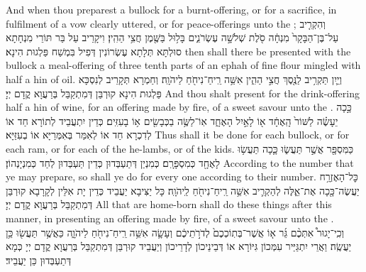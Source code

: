 {And when thou preparest a bullock for a burnt-offering, or for a sacrifice, in fulfilment of a vow clearly uttered, or for peace-offerings unto the \lord;}{}
{וְהִקְרִ֤יב עַל־בֶּן־הַבָּקָר֙ מִנְחָ֔ה סֹ֖לֶת שְׁלֹשָׁ֣ה עֶשְׂרֹנִ֑ים בָּל֥וּל בַּשֶּׁ֖מֶן חֲצִ֥י הַהִֽין׃}
{וִיקָרֵיב עַל בַּר תּוֹרֵי מִנְחָתָא סוּלְתָּא תְּלָתָא עֶשְׂרוֹנִין דְּפִיל בִּמְשַׁח פַּלְגוּת הִינָא׃}
{then shall there be presented with the bullock a meal-offering of three tenth parts of an ephah of fine flour mingled with half a hin of oil.}{}
{וְיַ֛יִן תַּקְרִ֥יב לַנֶּ֖סֶךְ חֲצִ֣י הַהִ֑ין אִשֵּׁ֥ה רֵֽיחַ־נִיחֹ֖חַ לַיהֹוָֽה׃
}
{וְחַמְרָא תְּקָרֵיב לְנִסְכָּא פַּלְגוּת הִינָא קוּרְבַּן דְּמִתְקַבַּל בְּרַעֲוָא קֳדָם יְיָ׃}
{And thou shalt present for the drink-offering half a hin of wine, for an offering made by fire, of a sweet savour unto the \lord.}{}
{כָּ֣כָה יֵעָשֶׂ֗ה לַשּׁוֹר֙ הָֽאֶחָ֔ד א֖וֹ לָאַ֣יִל הָאֶחָ֑ד אֽוֹ־לַשֶּׂ֥ה בַכְּבָשִׂ֖ים א֥וֹ בָעִזִּֽים׃
}
{כְּדֵין יִתְעֲבֵיד לְתוֹרָא חַד אוֹ לְדִכְרָא חַד אוֹ לְאִמַּר בְּאִמְּרַיָּא אוֹ בְעִזַּיָּא׃}
{Thus shall it be done for each bullock, or for each ram, or for each of the he-lambs, or of the kids.}{}
{כַּמִּסְפָּ֖ר אֲשֶׁ֣ר תַּעֲשׂ֑וּ כָּ֛כָה תַּעֲשׂ֥וּ לָאֶחָ֖ד כְּמִסְפָּרָֽם׃
}
{כְּמִנְיַן דְּתַעְבְּדוּן כְּדֵין תַּעְבְּדוּן לְחַד כְּמִנְיָנְהוֹן׃}
{According to the number that ye may prepare, so shall ye do for every one according to their number.}{}
{כׇּל־הָאֶזְרָ֥ח יַעֲשֶׂה־כָּ֖כָה אֶת־אֵ֑לֶּה לְהַקְרִ֛יב אִשֵּׁ֥ה רֵֽיחַ־נִיחֹ֖חַ לַֽיהֹוָֽה׃}
{כָּל יַצִּיבָא יַעֲבֵיד כְּדֵין יָת אִלֵּין לְקָרָבָא קוּרְבַּן דְּמִתְקַבַּל בְּרַעֲוָא קֳדָם יְיָ׃}
{All that are home-born shall do these things after this manner, in presenting an offering made by fire, of a sweet savour unto the \lord.}{}
{וְכִֽי־יָגוּר֩ אִתְּכֶ֨ם גֵּ֜ר א֤וֹ אֲשֶׁר־בְּתֽוֹכְכֶם֙ לְדֹרֹ֣תֵיכֶ֔ם וְעָשָׂ֛ה אִשֵּׁ֥ה רֵֽיחַ־נִיחֹ֖חַ לַיהֹוָ֑ה כַּאֲשֶׁ֥ר תַּעֲשׂ֖וּ כֵּ֥ן יַעֲשֶֽׂה׃}
{וַאֲרֵי יִתְגַּיַּיר עִמְּכוֹן גִּיּוֹרָא אוֹ דְּבֵינֵיכוֹן לְדָרֵיכוֹן וְיַעֲבֵיד קוּרְבַּן דְּמִתְקַבַּל בְּרַעֲוָא קֳדָם יְיָ כְּמָא דְּתַעְבְּדוּן כֵּן יַעֲבֵיד׃}
